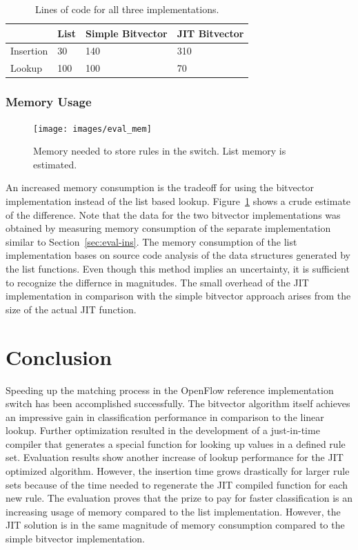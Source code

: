\documentclass[a4paper,
		12pt,
		parskip=full,
		titlepage
		]{scrartcl}
\begin{document}
\begin{table}
  \centering
  \begin{tabularx}{\textwidth}{l|XXX}
  &List&Simple Bitvector&JIT Bitvector\\
  \hline
  Insertion&30&140&310\\
  Lookup&100&100&70\\
  \end{tabularx}
  \caption{Lines of code for all three implementations.}
  \label{table:loc}
\end{table}

\subsubsection{Memory Usage}

\begin{figure}[H]
\centering
\texttt{[image: images/eval\_mem]}
\caption{Memory needed to store rules in the switch. List memory is estimated.}
\label{fig:eval-mem}
\end{figure}

An increased memory consumption is the tradeoff for using the bitvector implementation
instead of the list based lookup.
Figure~\ref{fig:eval-mem} shows a crude estimate of the difference.
Note that the data for the two bitvector implementations was obtained by measuring memory consumption of the separate implementation
similar to Section~\ref{sec:eval-ins}.
The memory consumption of the list implementation bases on source code analysis of 
the data structures generated by the list functions.
Even though this method implies an uncertainty, it is sufficient to recognize the differnce in magnitudes.
The small overhead of the JIT implementation in comparison with the simple bitvector approach
arises from the size of the actual JIT function.

\section{Conclusion}
Speeding up the matching process in the OpenFlow reference implementation switch has been accomplished successfully.
The bitvector algorithm itself achieves an impressive gain in classification 
performance in comparison to the linear lookup.
Further optimization resulted in the development of a just-in-time compiler 
that generates a special function for looking up values in a defined rule set.
Evaluation results show another increase of lookup performance for the JIT optimized algorithm.
However, the insertion time grows drastically for larger rule sets because 
of the time needed to regenerate the JIT compiled function for each new rule.
The evaluation proves that the prize to pay for faster classification 
is an increasing usage of memory compared to the list implementation.
However, the JIT solution is in the same magnitude of memory consumption 
compared to the simple bitvector implementation. 
\end{document}
